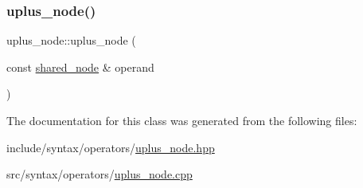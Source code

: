 \subsubsection{\texorpdfstring{uplus\+\_\+node()}{uplus\_node()}}
{\footnotesize\ttfamily uplus\+\_\+node\+::uplus\+\_\+node (\begin{DoxyParamCaption}\item[{const \hyperlink{namespacejawe_a3f307481d921b6cbb50cc8511fc2b544}{shared\+\_\+node} \&}]{operand }\end{DoxyParamCaption})}



The documentation for this class was generated from the following files\+:\begin{DoxyCompactItemize}
\item 
include/syntax/operators/\hyperlink{uplus__node_8hpp}{uplus\+\_\+node.\+hpp}\item 
src/syntax/operators/\hyperlink{uplus__node_8cpp}{uplus\+\_\+node.\+cpp}\end{DoxyCompactItemize}
